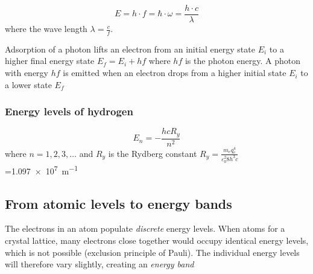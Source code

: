 \begin{equation}
	E = h \cdot f = \hbar \cdot \omega = \frac{h \cdot c}{\lambda}
\end{equation}
where the wave length $\lambda = \frac{c}{f}$. 

Adsorption of a photon lifts an electron from an initial energy state $E_i$ to a higher final
energy state $E_f = E_i + hf$ where $hf$ is the photon energy.
A photon with energy $hf$ is emitted when an electron drops from a higher initial state
$E_i$ to a lower state $E_f$

\subsubsection{Energy levels of hydrogen}

\begin{equation}
    E_n = -\frac{h c R_y}{n^2}
\end{equation}
where $n = 1,2,3,\ldots$ and $R_y$ is the Rydberg constant $R_y = \frac{m_e q_e^4}{\varepsilon_0^2 8 h^3 c}$=\SI{1.097e7}{\meter\tothe{-1}}

\subsection{From atomic levels to energy bands}
The electrons in an atom populate \emph{discrete} energy levels.
When atoms for a crystal lattice, many electrons close together would occupy
identical energy levels, which is not possible (exclusion principle of Pauli).
The individual energy levels will therefore vary slightly, creating an \emph{energy band}

